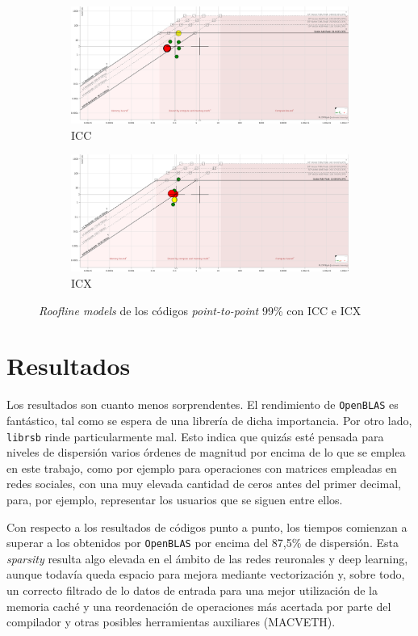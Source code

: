 \begin{figure}[htpb]
    \centering
    \begin{subfigure}[b]{0.495\textwidth}
        \includegraphics[width=\textwidth]{img/rooflines/roofline_p2p_99_icc.png}
        \caption{ICC}
        \label{fig:roofline_p2p_icc_99}
    \end{subfigure}
    \begin{subfigure}[b]{0.495\textwidth}
        \includegraphics[width=\textwidth]{img/rooflines/roofline_p2p_99_icx.png}
        \caption{ICX}
        \label{fig:roofline_p2p_icx_99}
    \end{subfigure}

    \caption{\textit{Roofline models} de los códigos \textit{point-to-point} 99\% con ICC e ICX}
    \label{fig:rooflines_p2p_icc_icx_99}
\end{figure}

\section{Resultados}
Los resultados son cuanto menos sorprendentes. El rendimiento de \texttt{OpenBLAS} es fantástico, tal como se espera de una librería de dicha importancia. Por otro lado, \texttt{librsb} rinde particularmente mal. Esto indica que quizás esté pensada para niveles de dispersión varios órdenes de magnitud por encima de lo que se emplea en este trabajo, como por ejemplo para operaciones con matrices empleadas en redes sociales, con una muy elevada cantidad de ceros antes del primer decimal, para, por ejemplo, representar los usuarios que se siguen entre ellos.

Con respecto a los resultados de códigos punto a punto, los tiempos comienzan a superar a los obtenidos por \texttt{OpenBLAS} por encima del 87,5\% de dispersión. Esta \textit{sparsity} resulta algo elevada en el ámbito de las redes reuronales y deep learning, aunque todavía queda espacio para mejora mediante vectorización y, sobre todo, un correcto filtrado de lo datos de entrada para una mejor utilización de la memoria caché y una reordenación de operaciones más acertada por parte del compilador y otras posibles herramientas auxiliares (MACVETH).